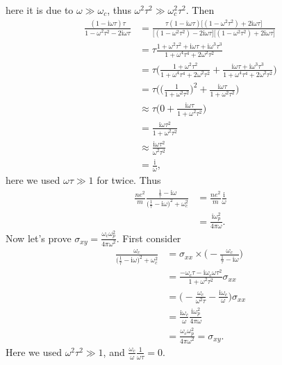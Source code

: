 \documentclass[12pt]{article}
\newcommand{\ii}{{\mathrm{i}}}
\begin{document}
here it is due to $\omega \gg \omega_c$, thus $\omega^2\tau^2 \gg \omega_c^2\tau^2$.
Then
\begin{equation}
	\begin{split}
		\frac{(1 -\ii \omega\tau)\tau}{1- \omega^2\tau^2 - 2\ii \omega\tau} &=
		\frac{\tau (1-\ii \omega\tau)\big[ (1 - \omega^2\tau^2) + 2\ii \omega\tau \big] }{\big[ (1 - \omega^2\tau^2) - 2\ii \omega\tau \big]\big[ (1 - \omega^2\tau^2) + 2\ii \omega\tau \big] } \\
		&= \tau \frac{1+\omega^2\tau^2 + \ii\omega\tau + \ii \omega^3\tau^3}{1+\omega^4\tau^4+2\omega^2\tau^2 }\\
		&= \tau \Big( \frac{1+\omega^2\tau^2}{1+\omega^4\tau^4+2\omega^2\tau^2 }
		+ \frac{ \ii\omega\tau + \ii \omega^3\tau^3}{1+\omega^4\tau^4+2\omega^2\tau^2 }\Big)\\
		&= \tau \bigg( \Big(\frac{1}{1+\omega^2\tau^2}\Big)^2 +  \frac{\ii\omega\tau}{1+\omega^2\tau^2}\bigg) \\
		&\approx \tau \bigg(0 + \frac{\ii\omega\tau}{1+\omega^2\tau^2}\bigg)\\
		&= \frac{\ii\omega\tau^2}{1+\omega^2\tau^2} \\
		&\approx  \frac{\ii\omega\tau^2}{\omega^2\tau^2}\\
		&= \frac{\ii}{\omega},
	\end{split}
\end{equation}
here we used $\omega\tau \gg 1$ for twice.
Thus
\begin{equation}
	\begin{split}
		\frac{ne^2}{m} \frac{\frac{1}{\tau}-\ii \omega}{\big(\frac{1}{\tau} - \ii \omega\big)^2 + \omega_c^2 } &= \frac{ne^2}{m }\frac{\ii}{\omega} \\
		&= \frac{\ii\omega_p^2}{4\pi\omega }.
	\end{split}
\end{equation}
Now let's prove $\sigma_{xy} = \frac{\omega_c\omega_p^2}{4\pi\omega^2 }$.
First consider
\begin{equation}
	\begin{split}
		\frac{\omega_c}{\big(\frac{1}{\tau} -\ii \omega\big)^2 + \omega_c^2 } &= \sigma_{xx} \times \Big( -
		\frac{\omega_c}{\frac{1}{\tau} -\ii\omega } \Big)\\
		&= \frac{-\omega_c \tau -\ii \omega_c\omega\tau^2}{1+\omega^2\tau^2}\sigma_{xx}\\
		&= \Big( -\frac{\omega_c}{\omega^2\tau } - \frac{\ii \omega_c}{\omega }\Big)\sigma_{xx}\\
		&=  \frac{\ii\omega_c}{\omega }\frac{\ii \omega_p^2}{4\pi\omega } \\
		&=  \frac{\omega_c\omega_p^2}{4\pi\omega^2 } =\sigma_{xy}.
	\end{split}
\end{equation}
Here we used $\omega^2\tau^2 \gg 1$, and $\frac{\omega_c}{\omega}\frac{1}{\omega\tau} = 0$.
\end{document}
